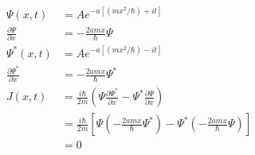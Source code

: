 \documentclass{article}
\begin{document}
\begin{enumerate}
        \begin{align*}
          \Psi(x, t)                         & = A e^{-a [(m x^2 / \hbar) + i t]}                                                                                                         \\
          \frac{\partial \Psi}{\partial x}   & = -\frac{2 a m x}{\hbar} \Psi                                                                                                              \\
          \Psi^*(x, t)                       & = A e^{-a [(m x^2 / \hbar) - i t]}                                                                                                         \\
          \frac{\partial \Psi^*}{\partial x} & = -\frac{2 a m x}{\hbar} \Psi^*                                                                                                            \\
          J(x, t)                            & = \frac{i \hbar}{2 m} \left( \Psi \frac{\partial \Psi^*}{\partial x} - \Psi^* \frac{\partial \Psi}{\partial x} \right)                     \\
                                             & = \frac{i \hbar}{2 m} \left[ \Psi \left( -\frac{2 a m x}{\hbar} \Psi^* \right) - \Psi^* \left( -\frac{2 a m x}{\hbar} \Psi \right) \right] \\
                                             & = 0
        \end{align*}
\end{enumerate}

\subsection{}
\end{document}
